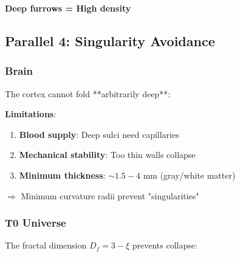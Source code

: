 	\begin{keyresult}
		\textbf{Deep furrows = High density}

		\vspace{0.3cm}

		\begin{center}
		\end{center}
	\end{keyresult}

	\subsection{Parallel 4: Singularity Avoidance}

	\subsubsection{Brain}

	The cortex cannot fold **arbitrarily deep**:

	\textbf{Limitations}:
	\begin{enumerate}
		\item \textbf{Blood supply}: Deep sulci need capillaries
		\item \textbf{Mechanical stability}: Too thin walls collapse
		\item \textbf{Minimum thickness}: $\sim 1.5 - 4$ mm (gray/white matter)
	\end{enumerate}

	$\Rightarrow$ Minimum curvature radii prevent "singularities"

	\subsubsection{T0 Universe}

	The fractal dimension $D_f = 3 - \xi$ prevents collapse:

